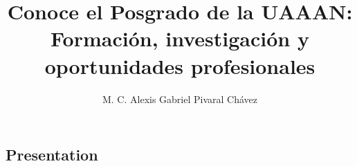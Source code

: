 \begin{browserSubsections}
\maketitle

\newpage
\begin{wrap}
	\chapter{Presentation}
\end{wrap}
\cero
\author{%
	M. C. Alexis Gabriel Pivaral Chávez
}
\corresponding{}{}
\title{Conoce el Posgrado de la UAAAN: Formación, investigación y oportunidades profesionales}

\maketitle


\end{browserSubsections}
